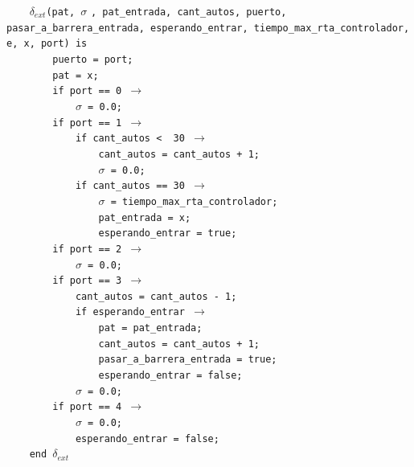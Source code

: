 \documentclass[12pt]{article}
\begin{document}
\begin{tcolorbox}[
    colback=black!5!white,
    colframe=black!80!white,
    boxrule=0.8pt,
    arc=2pt,
    left=5pt,
    right=5pt,
    top=5pt,
    bottom=5pt,
    fontupper=\ttfamily,
    breakable
]
\begin{flushleft}
\texttt{~~~~}$\delta_{ext}$\texttt{(pat, }$\sigma$ \texttt{, pat\_entrada, cant\_autos, puerto, pasar\_a\_barrera\_entrada, esperando\_entrar, tiempo\_max\_rta\_controlador, e, x, port) is} \\
\texttt{~~~~~~~~puerto = port;}\\
\texttt{~~~~~~~~pat = x;}\\
\texttt{~~~~~~~~if port == 0 }\(\rightarrow\)\\
\texttt{~~~~~~~~~~~~}$\sigma$\texttt{ = 0.0;}\\
\texttt{~~~~~~~~if port == 1 }\(\rightarrow\)\\
\texttt{~~~~~~~~~~~~if cant\_autos < \ 30 }\(\rightarrow\)\\
\texttt{~~~~~~~~~~~~~~~~cant\_autos = cant\_autos + 1;}\\
\texttt{~~~~~~~~~~~~~~~~}$\sigma$\texttt{ = 0.0;}\\
\texttt{~~~~~~~~~~~~if cant\_autos == 30 }\(\rightarrow\)\\
\texttt{~~~~~~~~~~~~~~~~}$\sigma$\texttt{ = tiempo\_max\_rta\_controlador;}\\
\texttt{~~~~~~~~~~~~~~~~pat\_entrada = x;}\\
\texttt{~~~~~~~~~~~~~~~~esperando\_entrar = true;}\\
\texttt{~~~~~~~~if port == 2 }\(\rightarrow\)\\
\texttt{~~~~~~~~~~~~}$\sigma$\texttt{ = 0.0;}\\
\texttt{~~~~~~~~if port == 3 }\(\rightarrow\)\\
\texttt{~~~~~~~~~~~~cant\_autos = cant\_autos - 1;}\\
\texttt{~~~~~~~~~~~~if esperando\_entrar }\(\rightarrow\)\\
\texttt{~~~~~~~~~~~~~~~~pat = pat\_entrada;}\\
\texttt{~~~~~~~~~~~~~~~~cant\_autos = cant\_autos + 1;}\\
\texttt{~~~~~~~~~~~~~~~~pasar\_a\_barrera\_entrada = true;}\\
\texttt{~~~~~~~~~~~~~~~~esperando\_entrar = false;}\\
\texttt{~~~~~~~~~~~~}$\sigma$\texttt{ = 0.0;}\\
\texttt{~~~~~~~~if port == 4 }\(\rightarrow\)\\
\texttt{~~~~~~~~~~~~}$\sigma$\texttt{ = 0.0;}\\
\texttt{~~~~~~~~~~~~esperando\_entrar = false;}\\
\texttt{~~~~end }$\delta_{ext}$
\end{flushleft}


\end{tcolorbox}
\end{document}
